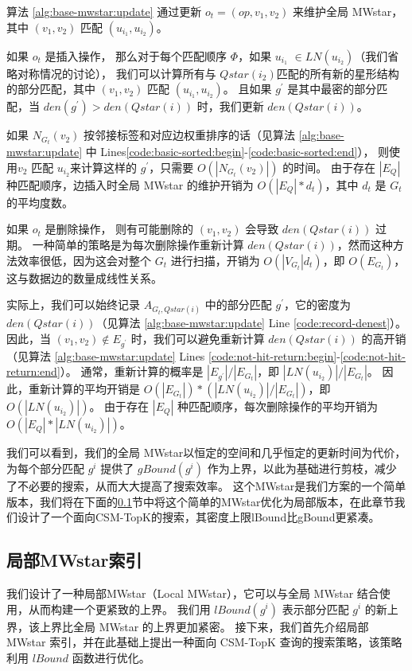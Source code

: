      算法 \ref{alg:base-mwstar:update} 通过更新 $o_t=(op, v_1, v_2)$ 来维护全局 MWstar，其中 $(v_1, v_2)$ 匹配 $(u_{i_1}, u_{i_2})$。
     
     如果 $o_t$ 是插入操作，
     那么对于每个匹配顺序 $\Phi$，如果 $u_{i_1}$ $\in LN(u_{i_2})$（我们省略对称情况的讨论），
     我们可以计算所有与 $Qstar(i_2)$匹配的所有新的星形结构的部分匹配，其中 $(v_1, v_2)$ 匹配 $(u_{i_1}, u_{i_2})$。
     且如果 $g^\prime$ 是其中最密的部分匹配，当 $den(g^\prime) > den(Qstar(i))$ 时，我们更新 $den(Qstar(i))$。
     
     如果 $N_{G_t}(v_2)$ 按邻接标签和对应边权重排序的话（见算法 \ref{alg:base-mwstar:update} 中 Lines\ref{code:basic-sorted:begin}-\ref{code:basic-sorted:end}），
     则使用$v_2$ 匹配 $u_{i_2}$来计算这样的 $g^\prime$，只需要 $O(|N_{G_t}(v_2)|)$ 的时间。
     由于存在 $|E_Q|$ 种匹配顺序，边插入时全局 MWstar 的维护开销为 $O(|E_Q|*d_t)$，其中 $d_t$ 是 $G_t$ 的平均度数。
     
     如果 $o_t$ 是删除操作，
     则有可能删除的 $(v_1, v_2)$ 会导致 $den(Qstar(i))$ 过期。
     一种简单的策略是为每次删除操作重新计算 $den(Qstar(i))$，然而这种方法效率很低，因为这会对整个 $G_t$ 进行扫描，开销为 $O(|V_{G_t}|d_t)$，即 $O(E_{G_t})$，这与数据边的数量成线性关系。
     
     实际上，我们可以始终记录 $A_{G_t, Qstar(i)}$ 中的部分匹配 $g^\prime$，它的密度为$den(Qstar(i))$（见算法 \ref{alg:base-mwstar:update} Line \ref{code:record-denest}）。
     因此，当 $(v_1, v_2) \notin E_{g^\prime}$ 时，我们可以避免重新计算 $den(Qstar(i))$ 的高开销（见算法 \ref{alg:base-mwstar:update}  Lines \ref{code:not-hit-return:begin}-\ref{code:not-hit-return:end}）。
     通常，重新计算的概率是 $|E_{g^\prime}|/|E_{G_t}|$，即 $|LN(u_{i_2})|/|E_{G_t}|$。
     因此，重新计算的平均开销是 $O(|E_{G_t}|)*(|LN(u_{i_2})|/|E_{G_t}|)$，即 $O(|LN(u_{i_2})|)$。
     由于存在 $|E_Q|$ 种匹配顺序，每次删除操作的平均开销为 $O(|E_Q|*|LN(u_{i_2})|)$。
     
     我们可以看到，我们的全局 MWstar以恒定的空间和几乎恒定的更新时间为代价，为每个部分匹配 $g^i$ 提供了 $gBound(g^i)$ 作为上界，以此为基础进行剪枝，减少了不必要的搜索，从而大大提高了搜索效率。
     这个MWstar是我们方案的一个简单版本，我们将在下面的\ref{mwstar:local}节中将这个简单的MWstar优化为局部版本，在此章节我们设计了一个面向CSM-TopK的搜索，其密度上限lBound比gBound更紧凑。

\subsection{局部MWstar索引}
\label{mwstar:local}
我们设计了一种局部MWstar（Local MWstar），它可以与全局 MWstar 结合使用，从而构建一个更紧致的上界。
我们用 $lBound(g^i)$ 表示部分匹配 $g^i$ 的新上界，该上界比全局 MWstar 的上界更加紧密。
接下来，我们首先介绍局部 MWstar 索引，并在此基础上提出一种面向 CSM-TopK 查询的搜索策略，该策略利用 $lBound$ 函数进行优化。

